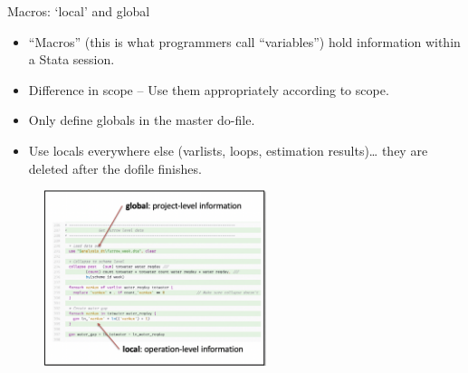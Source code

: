 \documentclass[aspectratio=169]{beamer}
\begin{document}
\begin{frame}[fragile]{Macros: `local’ and {global}}
\begin{multicols}{2}	
	
	\begin{itemize}[<default overlay specification>]
		\item<1> “Macros” (this is what programmers call “variables”) hold information within a Stata session.
		\item<1>  Difference in scope – Use them appropriately according to scope.
		\item<1>  Only define globals in the master do-file.
		\item<1>  Use locals everywhere else (varlists, loops, estimation results)… they are deleted after the dofile finishes. 
	\end{itemize}
	
	\begin{figure}
		\centering
		\includegraphics[width=65mm, right]{img/Syntax}
	\end{figure}
	
\end{multicols}
\end{frame}
\end{document}

